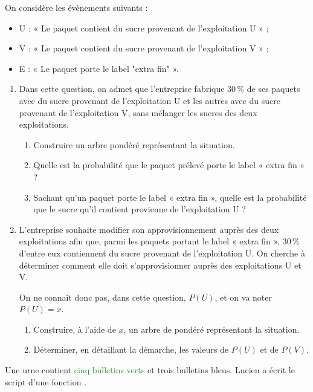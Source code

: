 \documentclass[a4paper,11pt]{article}
\begin{document}
On considère les évènements suivants :
%
\begin{itemize}
	\item U : « Le paquet contient du sucre provenant de l’exploitation U » ;
	\item V : « Le paquet contient du sucre provenant de l’exploitation V » ;
	\item E : « Le paquet porte le label "extra fin" ».
\end{itemize}
%
\begin{enumerate}
	\item Dans cette question, on admet que l’entreprise fabrique 30\,\% de ses paquets avec du sucre provenant de l’exploitation U et les autres avec du sucre provenant de l’exploitation V, sans mélanger les sucres des deux exploitations.
	\begin{enumerate}
		\item Construire un arbre pondéré représentant la situation.
		\item Quelle est la probabilité que le paquet prélevé porte le label « extra fin » ? 
		\item Sachant qu’un paquet porte le label « extra fin », quelle est la probabilité que le sucre qu’il contient provienne de l’exploitation U ? 
	\end{enumerate}
	\item L’entreprise souhaite modifier son approvisionnement auprès des deux exploitations afin que, parmi les paquets portant le label « extra fin », 30\,\% d’entre eux contiennent du sucre provenant de l’exploitation U. On cherche à déterminer comment elle doit s’approvisionner auprès des 
	exploitations U et V.
	
	On ne connaît donc pas, dans cette question, $P(U)$, et on va noter $P(U)=x$.
	\begin{enumerate}
		\item Construire, à l'aide de $x$, un arbre de pondéré représentant la situation.
		\item Déterminer, en détaillant la démarche, les valeurs de $P(U)$ et de $P(V)$.
	\end{enumerate}
\end{enumerate}

\medskip


\medskip

Une urne contient \textcolor{ForestGreen}{cinq bulletins verts} et {\blue trois bulletins bleus}. Lucien a écrit le script \calgpython{} d’une fonction .
\end{document}
